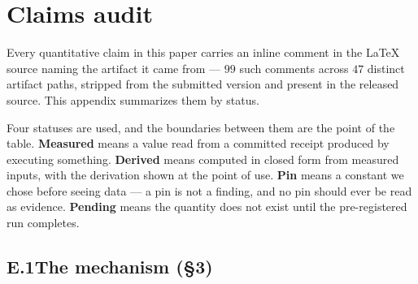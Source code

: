 %
%
\section{Claims audit}
\label{app:claims}

Every quantitative claim in this paper carries an inline comment in the \LaTeX{} source naming the
artifact it came from --- $99$ such comments across $47$ distinct artifact paths, stripped from
the submitted version and present in the released source. This appendix summarizes them by status.

Four statuses are used, and the boundaries between them are the point of the table.
\textbf{Measured} means a value read from a committed receipt produced by executing something.
\textbf{Derived} means computed in closed form from measured inputs, with the derivation shown at
the point of use. \textbf{Pin} means a constant we chose before seeing data --- a pin is not a
finding, and no pin should ever be read as evidence. \textbf{Pending} means the quantity does not
exist until the pre-registered run completes.

\subsection*{E.1\quad The mechanism (\S3)}

